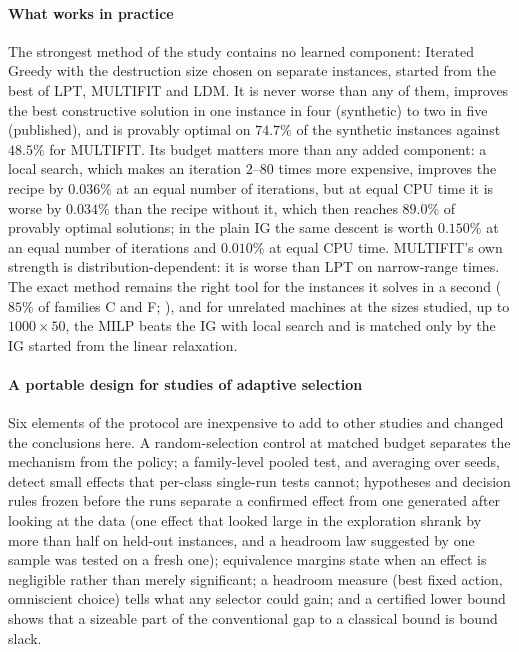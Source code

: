 \documentclass[final,3p,times,11pt,authoryear]{elsarticle}
\begin{document}
\paragraph{What works in practice}
The strongest method of the study contains no learned component: Iterated Greedy
with the destruction size chosen on separate instances, started from the best of
LPT, MULTIFIT and LDM. It is never worse than any of them, improves the best
constructive solution in one instance in four (synthetic) to two in five
(published), and is provably optimal on $74.7\%$ of the synthetic instances
against $48.5\%$ for MULTIFIT. Its budget matters more than any added component: a
local search, which makes an iteration $2$--$80$ times more expensive, improves the recipe by
$0.036\%$ at an equal number of iterations, but at equal CPU time it is worse by
$0.034\%$ than the recipe without it, which then reaches $89.0\%$ of provably
optimal solutions; in the plain IG the same descent is worth $0.150\%$ at an equal
number of iterations and $0.010\%$ at equal CPU time. MULTIFIT's own strength is distribution-dependent:
it is worse than LPT on narrow-range times. The exact method remains the right tool
for the instances it solves in a second ($85\%$ of families C and F;
\citealp{OstojicEtAl2025}), and for unrelated machines at the sizes studied, up to
$1000\times50$, the MILP beats the IG with local search and is matched only by the IG started from the linear relaxation.

\paragraph{A portable design for studies of adaptive selection}
Six elements of the protocol are inexpensive to add to other studies and changed
the conclusions here. A random-selection control at matched budget separates the
mechanism from the policy; a family-level pooled test, and averaging over seeds,
detect small effects that per-class single-run tests cannot; hypotheses and
decision rules frozen before the runs separate a confirmed effect from one
generated after looking at the data (one effect that looked large in the
exploration shrank by more than half on held-out instances, and a headroom law
suggested by one sample was tested on a fresh one); equivalence margins state
when an effect is negligible rather than merely significant; a headroom measure
(best fixed action, omniscient choice) tells what any selector could gain; and a
certified lower bound shows that a sizeable part of the conventional gap to a
classical bound is bound slack.
\end{document}

